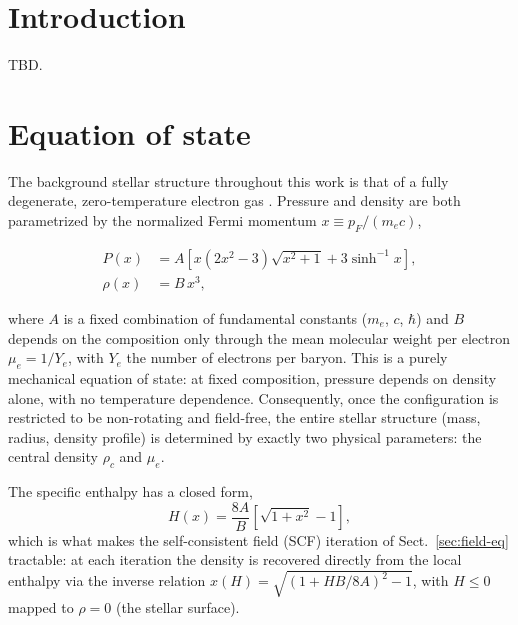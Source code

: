 \documentclass{aa}
\begin{document}

   \maketitle


\section{Introduction}

TBD.


\section{Equation of state}
\label{sec:eos}

The background stellar structure throughout this work is that of a
fully degenerate, zero-temperature electron gas
\citep[ztwd;][]{chandrasekhar1935}. Pressure and density are both
parametrized by the normalized Fermi momentum $x \equiv p_F/(m_e c)$,

\begin{align}
P(x) &= A \left[ x(2x^2-3)\sqrt{x^2+1} + 3\sinh^{-1}x \right],
\label{eq:pressure} \\
\rho(x) &= B\,x^3,
\label{eq:density}
\end{align}

\noindent where $A$ is a fixed combination of fundamental constants
($m_e$, $c$, $\hbar$) and $B$ depends on the composition only through
the mean molecular weight per electron $\mu_e = 1/Y_e$, with $Y_e$ the
number of electrons per baryon. This is a purely mechanical equation of
state: at fixed composition, pressure depends on density alone, with no
temperature dependence. Consequently, once the configuration is
restricted to be non-rotating and field-free, the entire stellar
structure (mass, radius, density profile) is determined by exactly two
physical parameters: the central density $\rho_c$ and $\mu_e$.

The specific enthalpy has a closed form,
\begin{equation}
H(x) = \frac{8A}{B}\left[\sqrt{1+x^2} - 1\right],
\end{equation}
which is what makes the self-consistent field (SCF) iteration of
Sect.~\ref{sec:field-eq} tractable: at each iteration the density is
recovered directly from the local enthalpy via the inverse relation
$x(H) = \sqrt{(1+HB/8A)^2 - 1}$, with $H \le 0$ mapped to $\rho = 0$
(the stellar surface).
\end{document}
